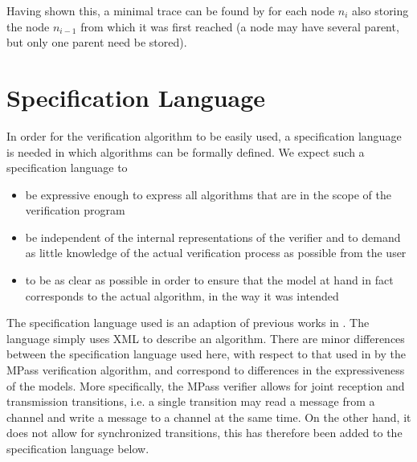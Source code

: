Having shown this, a minimal trace can be found by for each node $n_i$ also storing the node $n_{i-1}$ from which it was first reached (a node may have several parent, but only one parent need be stored). 

\newpage
\section{Specification Language}
\label{speclang}
In order for the verification algorithm to be easily used, a specification language is needed in which algorithms can be formally defined. We expect such a specification language to

\begin{itemize}
\item
be expressive enough to express all algorithms that are in the scope of the verification program
\item
be independent of the internal representations of the verifier and to demand as little knowledge of the actual verification process as possible from the user
\item
to be as clear as possible in order to ensure that the model at hand in fact corresponds to the actual algorithm, in the way it was intended
\end{itemize}

The specification language used is an adaption of previous works in \cite{mpass}. The language simply uses XML to describe an algorithm. There are minor differences between the specification language used here, with respect to that used in by the MPass verification algorithm, and correspond to differences in the expressiveness of the models. More specifically, the MPass verifier allows for joint reception and transmission transitions, i.e. a single transition may read a message from a channel and write a message to a channel at the same time. On the other hand, it does not allow for synchronized transitions, this has therefore been added to the specification language below.

